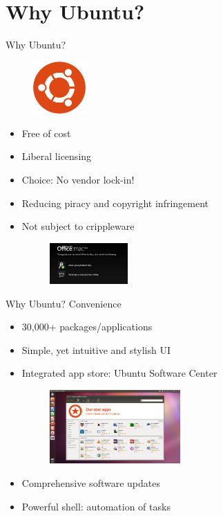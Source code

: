 \documentclass{beamer}
\begin{document}
 \section{Why Ubuntu?}
 \begin{frame}{Why Ubuntu?}
  \begin{figure}
   \includegraphics[width=2cm,height=2cm]{Images/cof_orange_hex1}
  \end{figure}
  \begin{itemize}
   \pause
   \item Free of cost
   \pause
   \item Liberal licensing
   \pause
   \item Choice: No vendor lock-in!
   \pause
   \item Reducing piracy and copyright infringement
   \pause
   \item Not subject to crippleware
    \begin{figure}
     \includegraphics[width=3cm]{Images/faqshot_upgradefig4}
    \end{figure}

  \end{itemize}
 \end{frame}

 \begin{frame}{Why Ubuntu?}
  Convenience
   \begin{itemize}
   \pause
    \item 30,000+ packages/applications
   \pause
    \item Simple, yet intuitive and stylish UI
   \pause
    \item Integrated app store: Ubuntu Software Center
    \begin{figure}
     \includegraphics[width=5cm]{Images/softwarecentre_0}
    \end{figure}
   \pause
    \item Comprehensive software updates
   \pause
    \item Powerful shell: automation of tasks
   \end{itemize} 
 \end{frame}
\end{document}
